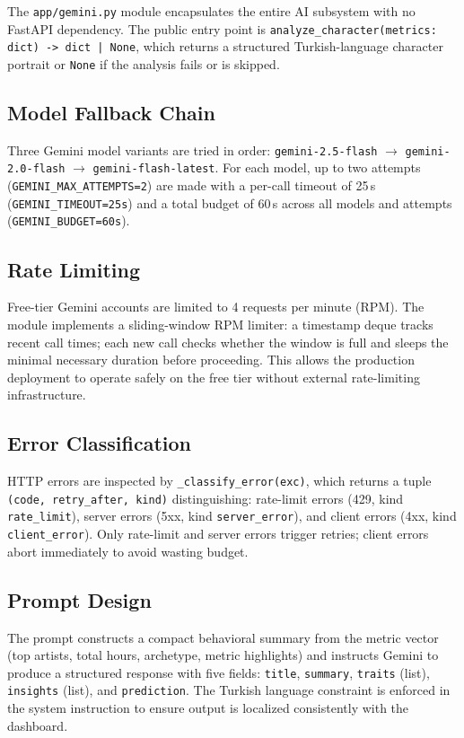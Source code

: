 \documentclass[conference]{IEEEtran}
\begin{document}
The \texttt{app/gemini.py} module encapsulates the entire AI subsystem
with no FastAPI dependency. The public entry point is
\texttt{analyze\_character(metrics: dict) -> dict | None}, which returns a
structured Turkish-language character portrait or \texttt{None} if the
analysis fails or is skipped.

\subsection{Model Fallback Chain}

Three Gemini model variants are tried in order:
\texttt{gemini-2.5-flash} $\to$ \texttt{gemini-2.0-flash} $\to$
\texttt{gemini-flash-latest}. For each model, up to two attempts
(\texttt{GEMINI\_MAX\_ATTEMPTS=2}) are made with a per-call timeout of
25\,s (\texttt{GEMINI\_TIMEOUT=25s}) and a total budget of 60\,s across
all models and attempts (\texttt{GEMINI\_BUDGET=60s}).

\subsection{Rate Limiting}

Free-tier Gemini accounts are limited to 4 requests per minute (RPM).
The module implements a sliding-window RPM limiter: a timestamp deque
tracks recent call times; each new call checks whether the window is full
and sleeps the minimal necessary duration before proceeding. This allows
the production deployment to operate safely on the free tier without
external rate-limiting infrastructure.

\subsection{Error Classification}

HTTP errors are inspected by \texttt{\_classify\_error(exc)}, which returns
a tuple \texttt{(code, retry\_after, kind)} distinguishing:
rate-limit errors (429, kind \texttt{rate\_limit}),
server errors (5xx, kind \texttt{server\_error}),
and client errors (4xx, kind \texttt{client\_error}).
Only rate-limit and server errors trigger retries; client errors abort
immediately to avoid wasting budget.

\subsection{Prompt Design}

The prompt constructs a compact behavioral summary from the metric vector
(top artists, total hours, archetype, metric highlights) and instructs
Gemini to produce a structured response with five fields: \texttt{title},
\texttt{summary}, \texttt{traits} (list), \texttt{insights} (list), and
\texttt{prediction}. The Turkish language constraint is enforced in the
system instruction to ensure output is localized consistently with the
dashboard.
\end{document}
